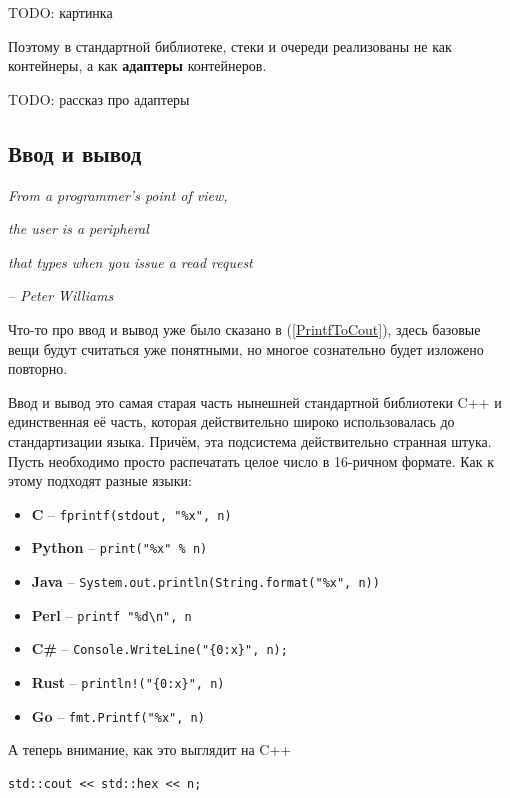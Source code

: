 \documentclass[a4paper,12pt,oneside]{article}
\begin{document}
TODO: картинка

Поэтому в стандартной библиотеке, стеки и очереди реализованы не как контейнеры, а как \textbf{адаптеры} контейнеров.

TODO: рассказ про адаптеры

\pagebreak
\subsection{Ввод и вывод}\label{subsec:iostreams}

\hfill\textit{From a programmer's point of view,}

\hfill\textit{the user is a peripheral}

\hfill\textit{that types when you issue a read request}{\vspace{0.5em}}

\hfill\textit{-- Peter Williams} 

Что-то про ввод и вывод уже было сказано в (\ref{PrintfToCout}), здесь базовые вещи будут считаться уже понятными, но многое сознательно будет изложено повторно. 

Ввод и вывод это самая старая часть нынешней стандартной библиотеки C++ и единственная её часть, которая действительно широко использовалась до стандартизации языка. Причём, эта подсистема действительно странная штука. Пусть необходимо просто распечатать целое число в 16-ричном формате. Как к этому подходят разные языки:

\begin{itemize}
\item \textbf{C } -- \lstinline!fprintf(stdout, "%x", n)!
\item \textbf{Python} -- \lstinline!print("%x" % n)!
\item \textbf{Java} -- \lstinline!System.out.println(String.format("%x", n))!
\item \textbf{Perl} -- \lstinline!printf "%d\n", n!
\item \textbf{C\#} -- \lstinline!Console.WriteLine("{0:x}", n);!
\item \textbf{Rust} -- \lstinline?println!("{0:x}", n)?
\item \textbf{Go} -- \lstinline!fmt.Printf("%x", n)!
\end{itemize}

А теперь внимание, как это выглядит на C++

\begin{lstlisting}
std::cout << std::hex << n;
\end{lstlisting}
\end{document}
